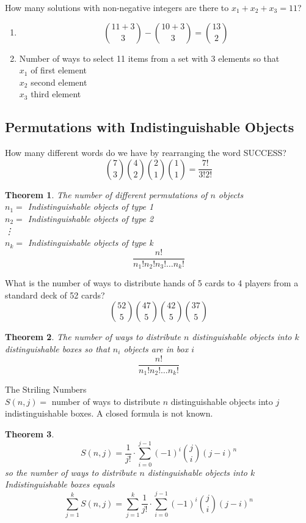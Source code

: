 \documentclass[letterpaper, 12pt]{article}
\newtheorem{theorem}{Theorem}[section]
\newenvironment{definition}[1][Definition]{\begin{trivlist}
\item[\hskip \labelsep {\bfseries #1}]}{\end{trivlist}}
\newenvironment{example}[1][Example]{\begin{trivlist}
\item[\hskip \labelsep {\bfseries #1}]}{\end{trivlist}}
\newcommand{\0}{\emptyset}
\begin{document}
    \begin{example}
        How many solutions with non-negative integers are there to $x_1+x_2+x_3=11$?
        \begin{enumerate}
            \item \[\binom{11+3}{3} - \binom{10+3}{3} = \binom{13}{2}\]
            \item Number of ways to select 11 items from a set with 3 elements so that \\
            $x_1$ of first element \\
            $x_2$ second element \\
            $x_3$ third element
        \end{enumerate}
    \end{example}
    \subsection*{Permutations with Indistinguishable Objects}
    \begin{example}
        How many different words do we have by rearranging the word SUCCESS?
        \[\binom{7}{3}\binom{4}{2}\binom{2}{1}\binom{1}{1} = \frac{7!}{3!2!}\]
    \end{example}
    \begin{theorem}
        The number of different permutations of $n$ objects \\
        $n_1=$ Indistinguishable objects of type 1 \\
        $n_2=$ Indistinguishable objects of type 2 \\
        \vdots \\
        $n_k=$ Indistinguishable objects of type k
        \[\frac{n!}{n_1!n_2!n_3!\dots n_k!}\]
    \end{theorem}
    \begin{example}
        What is the number of ways to distribute hands of 5 cards to 4 players from a standard 
        deck of 52 cards?
        \[\binom{52}{5}\binom{47}{5}\binom{42}{5}\binom{37}{5}\]
    \end{example}
    \begin{theorem}
        The number of ways to distribute $n$ distinguishable objects into $k$ distinguishable 
        boxes so that $n_i$ objects are in box $i$
        \[\frac{n!}{n_1!n_2!\dots n_k!}\]
    \end{theorem}
    \begin{definition}
        The Striling Numbers \\
        $S(n, j) = $ number of ways to distribute $n$ distinguishable objects into $j$ 
        indistinguishable boxes. A closed formula is not known.
    \end{definition}
    \begin{theorem}
        \[S(n, j) = \frac{1}{j!} \cdot \sum_{i=0}^{j-1} (-1)^i \binom{j}{i} (j-i)^n\]
        so the number of ways to distribute $n$ distinguishable objects into $k$ Indistinguishable 
        boxes equals
        \[\sum_{j=1}^{k} S(n, j) = \sum_{j=1}^{k} \frac{1}{j!} \cdot \sum_{i=0}^{j-1} (-1)^i \binom{j}{i} (j-i)^n\]
    \end{theorem}
\end{document}
